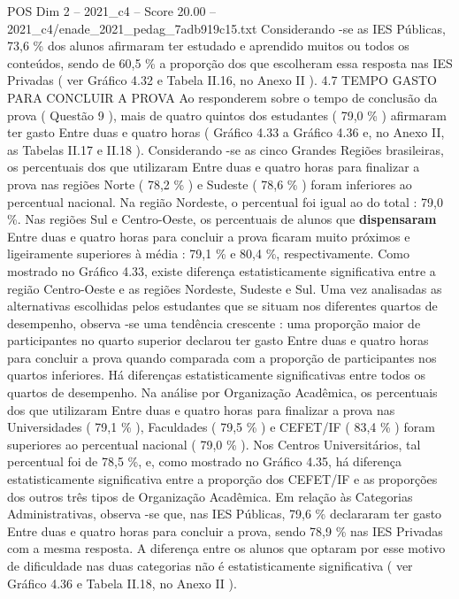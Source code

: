 \begin{textsample}{POS Dim 2 – 2021\_c4 – Score 20.00 – 2021\_c4/enade\_2021\_pedag\_7adb919c15.txt}
Considerando -se as IES Públicas, 73,6 \% dos alunos afirmaram ter estudado e aprendido muitos ou todos os conteúdos, sendo de 60,5 \% a proporção dos que escolheram essa resposta nas IES Privadas ( ver Gráfico 4.32 e Tabela II.16, no Anexo II ). 4.7 TEMPO GASTO PARA CONCLUIR A PROVA Ao responderem sobre o tempo de conclusão da prova ( Questão 9 ), mais de quatro quintos dos estudantes ( 79,0 \% ) afirmaram ter gasto Entre duas e quatro horas ( Gráfico 4.33 a Gráfico 4.36 e, no Anexo II, as Tabelas II.17 e II.18 ).
Considerando -se as cinco Grandes Regiões brasileiras, os percentuais dos que utilizaram Entre duas e quatro horas para finalizar a prova nas regiões Norte ( 78,2 \% ) e Sudeste ( 78,6 \% ) foram inferiores ao percentual nacional.
Na região Nordeste, o percentual foi igual ao do total : 79,0 \%.
Nas regiões Sul e Centro-Oeste, os percentuais de alunos que \textbf{dispensaram} Entre duas e quatro horas para concluir a prova ficaram muito próximos e ligeiramente superiores à média : 79,1 \% e 80,4 \%, respectivamente.
Como mostrado no Gráfico 4.33, existe diferença estatisticamente significativa entre a região Centro-Oeste e as regiões Nordeste, Sudeste e Sul.
Uma vez analisadas as alternativas escolhidas pelos estudantes que se situam nos diferentes quartos de desempenho, observa -se uma tendência crescente : uma proporção maior de participantes no quarto superior declarou ter gasto Entre duas e quatro horas para concluir a prova quando comparada com a proporção de participantes nos quartos inferiores.
Há diferenças estatisticamente significativas entre todos os quartos de desempenho.
Na análise por Organização Acadêmica, os percentuais dos que utilizaram Entre duas e quatro horas para finalizar a prova nas Universidades ( 79,1 \% ), Faculdades ( 79,5 \% ) e CEFET/IF ( 83,4 \% ) foram superiores ao percentual nacional ( 79,0 \% ).
Nos Centros Universitários, tal percentual foi de 78,5 \%, e, como mostrado no Gráfico 4.35, há diferença estatisticamente significativa entre a proporção dos CEFET/IF e as proporções dos outros três tipos de Organização Acadêmica.
Em relação às Categorias Administrativas, observa -se que, nas IES Públicas, 79,6 \% declararam ter gasto Entre duas e quatro horas para concluir a prova, sendo 78,9 \% nas IES Privadas com a mesma resposta.
A diferença entre os alunos que optaram por esse motivo de dificuldade nas duas categorias não é estatisticamente significativa ( ver Gráfico 4.36 e Tabela II.18, no Anexo II ).

\end{textsample}
